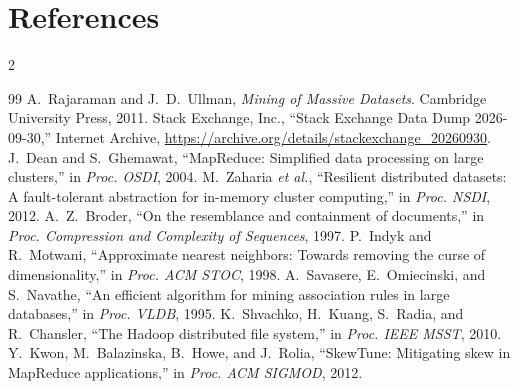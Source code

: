 \documentclass[11pt,a4paper]{article}
\begin{document}
\section{References}
\vspace{-14pt}
\begin{multicols}{2}
{\footnotesize
\renewcommand{\section}[2]{}
\begin{thebibliography}{99}
\setlength{\itemsep}{0pt}
\setlength{\parskip}{0pt}
 A.~Rajaraman and J.~D.~Ullman, \emph{Mining of Massive Datasets}. Cambridge University Press, 2011.
 Stack Exchange, Inc., ``Stack Exchange Data Dump 2026-09-30,'' Internet Archive, \url{https://archive.org/details/stackexchange_20260930}.
 J.~Dean and S.~Ghemawat, ``MapReduce: Simplified data processing on large clusters,'' in \emph{Proc. OSDI}, 2004.
 M.~Zaharia \emph{et al.}, ``Resilient distributed datasets: A fault-tolerant abstraction for in-memory cluster computing,'' in \emph{Proc. NSDI}, 2012.
 A.~Z.~Broder, ``On the resemblance and containment of documents,'' in \emph{Proc. Compression and Complexity of Sequences}, 1997.
 P.~Indyk and R.~Motwani, ``Approximate nearest neighbors: Towards removing the curse of dimensionality,'' in \emph{Proc. ACM STOC}, 1998.
 A.~Savasere, E.~Omiecinski, and S.~Navathe, ``An efficient algorithm for mining association rules in large databases,'' in \emph{Proc. VLDB}, 1995.
 K.~Shvachko, H.~Kuang, S.~Radia, and R.~Chansler, ``The Hadoop distributed file system,'' in \emph{Proc. IEEE MSST}, 2010.
 Y.~Kwon, M.~Balazinska, B.~Howe, and J.~Rolia, ``SkewTune: Mitigating skew in MapReduce applications,'' in \emph{Proc. ACM SIGMOD}, 2012.
\end{thebibliography}}
\end{multicols}
\end{document}
